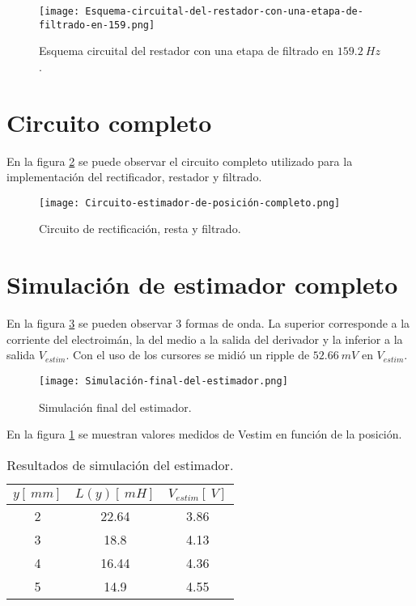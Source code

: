\begin{figure}[H]
	\centering
	\texttt{[image: Esquema-circuital-del-restador-con-una-etapa-de-filtrado-en-159.png]}
	\caption{Esquema circuital del restador con una etapa de filtrado en $159.2\: Hz$.}
	\label{fig:img_Esquema-circuital-del-restador-con-una-etapa-de-filtrado-en-159}
\end{figure}

\section{Circuito completo}

\noindent En la figura \ref{fig:img_Circuito_estimador_de_posición_completo} se puede observar el circuito completo utilizado para la implementaci\'{o}n del rectificador, restador y filtrado.

\begin{figure}[H]
	\centering
	\texttt{[image: Circuito-estimador-de-posición-completo.png]}
	\caption{Circuito de rectificación, resta y filtrado.}
	\label{fig:img_Circuito_estimador_de_posición_completo}
\end{figure}

\section{Simulaci\'{o}n de estimador completo}

\noindent En la figura \ref{fig:img_Simulación_final_del_estimado} se pueden observar 3 formas de onda. La superior corresponde a la corriente del electroim\'{a}n, la del medio a la salida del derivador y la inferior a la salida $V_{estim}$. Con el uso de los cursores se midi\'{o} un ripple de $52.66\:mV $ en $V_{estim}$.

\begin{figure}[H]
	\centering
	\texttt{[image: Simulación-final-del-estimador.png]}
	\caption{Simulación final del estimador.}
	\label{fig:img_Simulación_final_del_estimado}
\end{figure}

\noindent En la figura \ref{tab_Resultados_de_simulación_del_estimador} se muestran valores medidos de Vestim en funci\'{o}n de la posici\'{o}n.

\begin{table}[H]
	\begin{center}
		\begin{tabular}{| c | c | c |}
			\hline
		$y [\:mm]$ & $L(y) [\:mH]$ & $V_{estim} [\:V]$ \\ \hline 
		2 & 22.64 & 3.86 \\ \hline 
		3 & 18.8 & 4.13 \\ \hline 
		4 & 16.44 & 4.36 \\ \hline 
		5 & 14.9 & 4.55 \\ \hline 
		\end{tabular}
		\caption{Resultados de simulación del estimador.}
		\label{tab_Resultados_de_simulación_del_estimador}
	\end{center}
\end{table}

